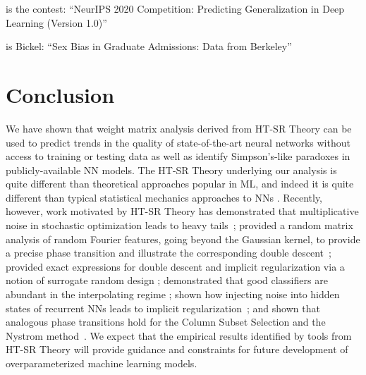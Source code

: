 \documentclass{article}
\begin{document}
\cite{JFYx20_contest_v10} is the contest: ``{NeurIPS} 2020 Competition: Predicting Generalization in Deep Learning (Version 1.0)''

\cite{BHO75} is Bickel: ``Sex Bias in Graduate Admissions: Data from Berkeley''




\section{Conclusion}

We have shown that weight matrix analysis derived from HT-SR Theory can be used to predict trends in the quality of state-of-the-art neural networks without access to training or testing data as well as identify Simpson's-like paradoxes in publicly-available NN models.
The HT-SR Theory underlying our analysis is quite different than theoretical approaches popular in ML, and indeed it is quite different than typical statistical mechanics approaches to NNs \cite{BKPx20}.
Recently, however, work motivated by HT-SR Theory has 
demonstrated that multiplicative noise in stochastic optimization leads to heavy tails~\cite{HodMah20A_TR,GSZ20_TR}; 
provided a random matrix analysis of random {F}ourier features, going beyond the {G}aussian kernel, to provide a precise phase transition and illustrate the corresponding double descent~\cite{ZCM20_TR}; 
provided exact expressions for double descent and implicit regularization via a notion of surrogate random design \cite{DLM19_Exact_TR}; 
demonstrated that good classifiers are abundant in the interpolating regime \cite{TKM20_TR};
shown how injecting noise into hidden states of recurrent NNs leads to implicit regularization~\cite{LEHM21_TR,Mah12}; and 
shown that analogous phase transitions hold for the {C}olumn {S}ubset {S}election and the {N}ystrom method~\cite{DKM20_TR}. 
We expect that the empirical results identified by tools from HT-SR Theory will provide guidance and constraints for future development of overparameterized machine learning models.




\end{document}
